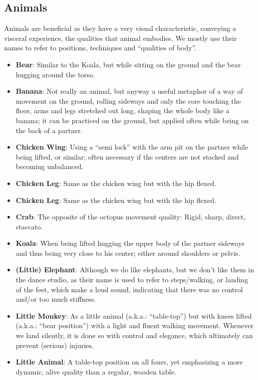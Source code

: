 \subsection{Animals}\label{subsec:animals}

Animals are beneficial as they have a very visual characteristic, conveying a visceral experience, the qualities that animal embodies.
We mostly use their names to refer to positions, techniques and ``qualities of body''.

\begin{itemize}
    \item \textbf{Bear}: Similar to the Koala, but while sitting on the ground and the bear hugging around the torso.
    \item \textbf{Banana}: Not really an animal, but anyway a useful metaphor of a way of movement on the ground, rolling sideways and only the core touching the floor, arms and legs stretched out long, shaping the whole body like a banana; it can be practiced on the ground, but applied often while being on the back of a partner.
    \item \textbf{Chicken Wing}: Using a ``semi lock'' with the arm pit on the partner while being lifted, or similar; often necessary if the centers are not stacked and becoming unbalanced.
    \item \textbf{Chicken Leg}: Same as the chicken wing but with the hip flexed.
    \item \textbf{Chicken Leg}: Same as the chicken wing but with the hip flexed.
    \item \textbf{Crab}: The opposite of the octopus movement quality: Rigid, sharp, direct, staccato.
    \item \textbf{Koala}: When being lifted hugging the upper body of the partner sideways and thus being very close to his center; either around shoulders or pelvis.
    \item \textbf{(Little) Elephant}: Although we do like elephants, but we don't like them in the dance studio, as their name is used to refer to steps/walking, or landing of the feet, which make a loud sound, indicating that there was no control and/or too much stiffness.
    \item \textbf{Little Monkey}: As a little animal (a.k.a.: ``table-top'') but with knees lifted (a.k.a.: ``bear position'') with a light and fluent walking movement.
    Whenever we land silently, it is done so with control and elegance, which ultimately can prevent (serious) injuries.
    \item \textbf{Little Animal}: A table-top position on all fours, yet emphasizing a more dynamic, alive quality than a regular, wooden table.

\end{itemize}
